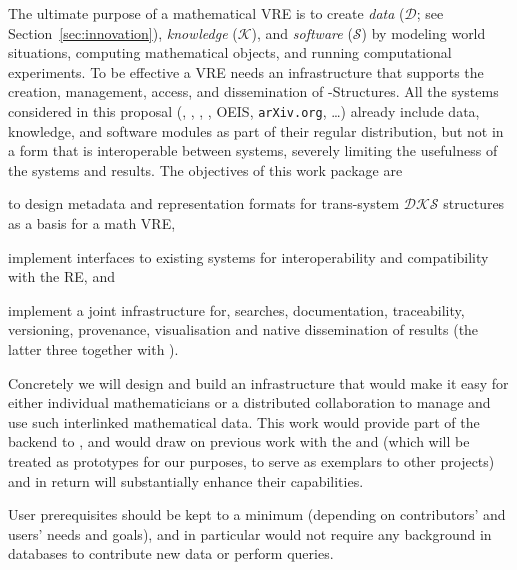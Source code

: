 \begin{workpackage}[id=dksbases,%
  title=Data/Knowledge/Software-Bases,lead=FAU,
  ZHRM=12,JURM=12,FAURM=34,UWRM=25,SARM=10,LLRM=2,PSRM=25]

\begin{wpobjectives}
  The ultimate purpose of a mathematical VRE is to create \emph{data} ($\mathcal{D}$; see
  Section~\ref{sec:innovation}), \emph{knowledge} ($\mathcal{K}$), and \emph{software} ($\mathcal{S}$)
  by modeling world situations, computing mathematical objects, and running
  computational experiments. To be effective a VRE needs an infrastructure that supports
  the creation, management, access, and dissemination of \DKS-Structures.  All
  the systems considered in this proposal (\GAP, \Sage, \Pari, \Singular, OEIS, \texttt{arXiv.org},
  \ldots) already include data, knowledge, and software modules as part of their regular
  distribution, but not in a form that is interoperable between systems, severely limiting
  the usefulness of the systems and results. The objectives of this work package are
\begin{compactenum}
\item to design metadata and representation formats for trans-system $\mathcal{DKS}$
  structures as a basis for a math VRE, 
\item implement interfaces to existing systems for interoperability and compatibility with
  the RE, and
\item implement a joint \DKS infrastructure for, searches, documentation, traceability,
  versioning, provenance, visualisation and native dissemination of \TheProject results
  (the latter three together with ).
\end{compactenum}
Concretely we will design and build an infrastructure that would make it easy for either
individual mathematicians or a distributed collaboration to manage and use such
interlinked mathematical data. This work would provide part of the backend to ,
and would draw on previous work with the \LMFDB and \FindStat (which will be treated as
prototypes for our purposes, to serve as exemplars to other projects) and in return will
substantially enhance their capabilities.

User prerequisites should be kept to a minimum (depending on contributors' and users'
needs and goals), and in particular would not require any background in databases to
contribute new data or perform queries.
\end{wpobjectives}


\end{workpackage}
